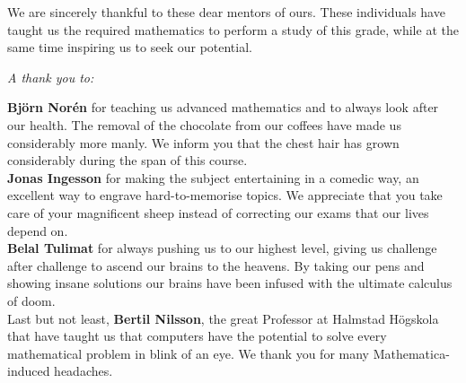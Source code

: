 \documentclass[main.tex]{subfiles}
\begin{document}
We are sincerely thankful to these dear mentors of ours. These individuals have
taught us the required mathematics to perform a study of this grade, while at
the same time inspiring us to seek our potential. \\

\begin{center}
  \emph{A thank you to:} \\
\end{center}

\textbf{Björn Norén} for teaching us advanced mathematics and to always look
after our health. The removal of the chocolate from our coffees have made us
considerably more manly. We inform you that the chest
hair has grown considerably during the span of this course. \\

\textbf{Jonas Ingesson} for making the subject entertaining in a comedic way, an
excellent way to engrave hard-to-memorise topics. We appreciate that you take
care of your magnificent sheep instead of correcting our exams
that our lives depend on. \\

\textbf{Belal Tulimat} for always pushing us to our highest level, giving us
challenge after challenge to ascend our brains to the heavens. By taking our
pens and showing insane solutions our brains have been infused with the ultimate
calculus of doom. \\

Last but not least, \textbf{Bertil Nilsson}, the great Professor at Halmstad
Högskola that have taught us that computers have the potential to solve
every mathematical problem in blink of an eye. We thank you for many Mathematica-induced headaches.\\
\end{document}
